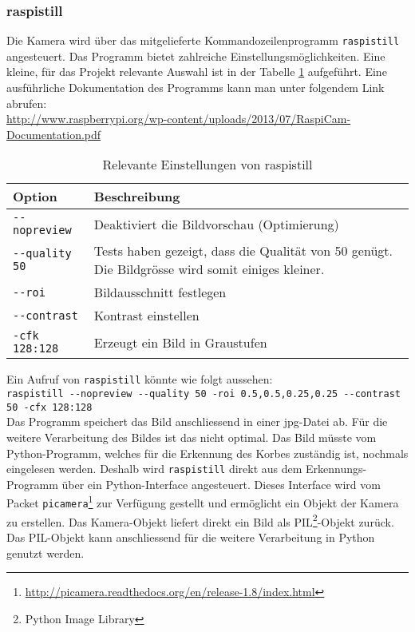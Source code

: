 \subsubsection{raspistill}
Die Kamera wird über das mitgelieferte Kommandozeilenprogramm \verb|raspistill| angesteuert. Das Programm bietet zahlreiche Einstellungsmöglichkeiten. Eine kleine, für das Projekt relevante Auswahl ist in der Tabelle \ref{tab:raspistill} aufgeführt. Eine ausführliche Dokumentation des Programms kann man unter folgendem Link abrufen: \\

\href{http://www.raspberrypi.org/wp-content/uploads/2013/07/RaspiCam-Documentation.pdf}{http://www.raspberrypi.org/wp-content/uploads/2013/07/RaspiCam-Documentation.pdf} \\

\begin{table}[h!]
	\renewcommand{\arraystretch}{1.5}
	\begin{tabular}{|l|p{14cm}|}
		\hline Option & Beschreibung \\ 
		\hline \verb|--nopreview| & Deaktiviert die Bildvorschau (Optimierung) \\ 
		\hline  \verb|--quality 50| & Tests haben gezeigt, dass die Qualität von 50 genügt. Die Bildgrösse wird somit einiges kleiner. \\ 
		\hline  \verb|--roi| & Bildausschnitt festlegen \\ 
		\hline  \verb|--contrast| & Kontrast einstellen \\ 
		\hline  \verb|-cfk 128:128| & Erzeugt ein Bild in Graustufen \\ 
		\hline 
	\end{tabular} 
	\caption{Relevante Einstellungen von raspistill}
	\label{tab:raspistill}
\end{table}

Ein Aufruf von \verb|raspistill| könnte wie folgt aussehen: \\

\verb|raspistill --nopreview --quality 50 -roi 0.5,0.5,0.25,0.25 --contrast 50 -cfx 128:128| \\

Das Programm speichert das Bild anschliessend in einer jpg-Datei ab. Für die weitere Verarbeitung des Bildes ist das nicht optimal. Das Bild müsste vom Python-Programm, welches für die Erkennung des Korbes zuständig ist, nochmals eingelesen werden. Deshalb wird \verb|raspistill| direkt aus dem Erkennungs-Programm über ein Python-Interface angesteuert. Dieses Interface wird vom Packet \verb|picamera|\footnote{\href{http://picamera.readthedocs.org/en/release-1.8/index.html}{http://picamera.readthedocs.org/en/release-1.8/index.html}} zur Verfügung gestellt und ermöglicht ein Objekt der Kamera zu erstellen. Das Kamera-Objekt liefert direkt ein Bild als PIL\footnote{Python Image Library}-Objekt zurück. Das PIL-Objekt kann anschliessend für die weitere Verarbeitung in Python genutzt werden.
